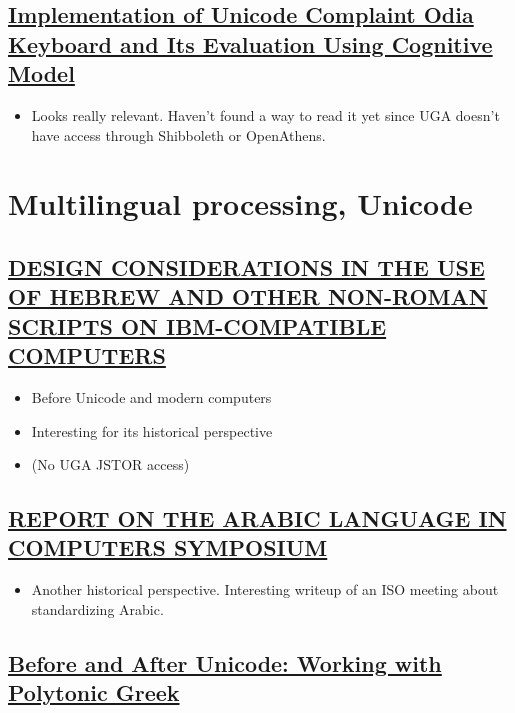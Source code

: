 \documentclass[11pt]{article}
\begin{document}
\subsection{\href{https://ieeexplore.ieee.org/document/7033301/}{Implementation of Unicode Complaint Odia Keyboard and Its Evaluation Using Cognitive Model}}
\label{sec:org5da98df}

\begin{itemize}
\item Looks really relevant. Haven't found a way to read it yet since UGA doesn't have access through Shibboleth or OpenAthens.
\end{itemize}

\section{Multilingual processing, Unicode}
\label{sec:org9b19fc5}

\subsection{\href{https://www.jstor.org/stable/23535305}{DESIGN CONSIDERATIONS IN THE USE OF HEBREW AND OTHER NON-ROMAN SCRIPTS ON IBM-COMPATIBLE COMPUTERS}}
\label{sec:org3a3c7a8}

\begin{itemize}
\item Before Unicode and modern computers
\item Interesting for its historical perspective
\item (No UGA JSTOR access)
\end{itemize}

\subsection{\href{https://www.jstor.org/stable/29785130}{REPORT ON THE ARABIC LANGUAGE IN COMPUTERS SYMPOSIUM}}
\label{sec:orgdbf51f0}

\begin{itemize}
\item Another historical perspective. Interesting writeup of an ISO meeting about standardizing Arabic.
\end{itemize}

\subsection{\href{http://ucbclassics.dreamhosters.com/djm/unicodeTalk/BeforeAndAfterUnicode.pdf}{Before and After Unicode: Working with Polytonic Greek}}
\label{sec:orgecf6f06}
\end{document}
